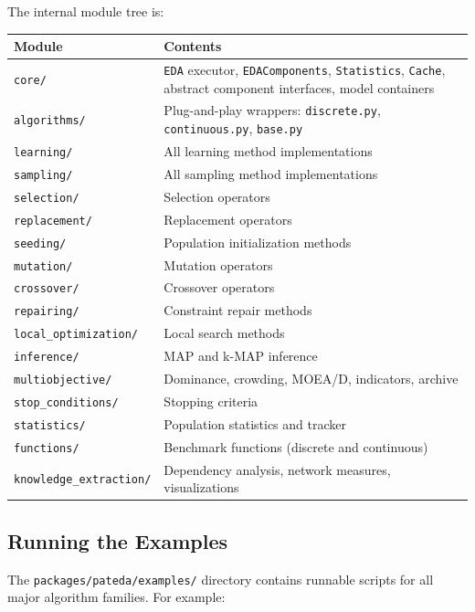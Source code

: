 \documentclass[a4paper,11pt]{article}
\begin{document}
The internal module tree is:

\begin{center}
\begin{tabular}{lp{9cm}}
\toprule
\textbf{Module} & \textbf{Contents} \\
\midrule
\texttt{core/} & \texttt{EDA} executor, \texttt{EDAComponents}, \texttt{Statistics}, \texttt{Cache}, abstract component interfaces, model containers \\
\texttt{algorithms/} & Plug-and-play wrappers: \texttt{discrete.py}, \texttt{continuous.py}, \texttt{base.py} \\
\texttt{learning/} & All learning method implementations \\
\texttt{sampling/} & All sampling method implementations \\
\texttt{selection/} & Selection operators \\
\texttt{replacement/} & Replacement operators \\
\texttt{seeding/} & Population initialization methods \\
\texttt{mutation/} & Mutation operators \\
\texttt{crossover/} & Crossover operators \\
\texttt{repairing/} & Constraint repair methods \\
\texttt{local\_optimization/} & Local search methods \\
\texttt{inference/} & MAP and k-MAP inference \\
\texttt{multiobjective/} & Dominance, crowding, MOEA/D, indicators, archive \\
\texttt{stop\_conditions/} & Stopping criteria \\
\texttt{statistics/} & Population statistics and tracker \\
\texttt{functions/} & Benchmark functions (discrete and continuous) \\
\texttt{knowledge\_extraction/} & Dependency analysis, network measures, visualizations \\
\bottomrule
\end{tabular}
\end{center}

\subsection{Running the Examples}

The \texttt{packages/pateda/examples/} directory contains runnable scripts for
all major algorithm families.  For example:
\end{document}
